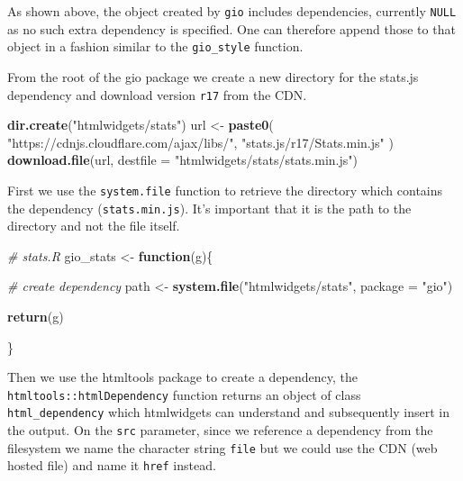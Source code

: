 \documentclass[
]{krantz}
\makeatletter
\newenvironment{Shaded}{\begin{snugshade}}{\end{snugshade}}
\newcommand{\CommentTok}[1]{\textcolor[rgb]{0.37,0.37,0.37}{\textit{#1}}}
\newcommand{\ControlFlowTok}[1]{\textcolor[rgb]{0.27,0.27,0.27}{\textbf{#1}}}
\newcommand{\DataTypeTok}[1]{\textcolor[rgb]{0.27,0.27,0.27}{#1}}
\newcommand{\KeywordTok}[1]{\textcolor[rgb]{0.27,0.27,0.27}{\textbf{#1}}}
\newcommand{\NormalTok}[1]{#1}
\newcommand{\StringTok}[1]{\textcolor[rgb]{0.5,0.5,0.5}{#1}}
\newenvironment{kframe}{%
\medskip{}
\setlength{\fboxsep}{.8em}
 \def\at@end@of@kframe{}%
 \ifinner\ifhmode%
  \def\at@end@of@kframe{\end{minipage}}%
  \begin{minipage}{\columnwidth}%
 \fi\fi%
 \def\FrameCommand##1{\hskip\@totalleftmargin \hskip-\fboxsep
 \colorbox{shadecolor}{##1}\hskip-\fboxsep
     \hskip-\linewidth \hskip-\@totalleftmargin \hskip\columnwidth}%
 \MakeFramed {\advance\hsize-\width
   \@totalleftmargin\z@ \linewidth\hsize
   \@setminipage}}%
 {\par\unskip\endMakeFramed%
 \at@end@of@kframe}
\renewenvironment{Shaded}{\begin{kframe}}{\end{kframe}}
\makeatother
\begin{document}
As shown above, the object created by \texttt{gio} includes dependencies, currently \texttt{NULL} as no such extra dependency is specified. One can therefore append those to that object in a fashion similar to the \texttt{gio\_style} function.

From the root of the gio package we create a new directory for the stats.js dependency and download version \texttt{r17} from the CDN.

\begin{Shaded}
\begin{Highlighting}[]
\KeywordTok{dir.create}\NormalTok{(}\StringTok{"htmlwidgets/stats"}\NormalTok{)}
\NormalTok{url <{-}}\StringTok{ }\KeywordTok{paste0}\NormalTok{(}
  \StringTok{"https://cdnjs.cloudflare.com/ajax/libs/"}\NormalTok{,}
  \StringTok{"stats.js/r17/Stats.min.js"}
\NormalTok{)}
\KeywordTok{download.file}\NormalTok{(url, }\DataTypeTok{destfile =} \StringTok{"htmlwidgets/stats/stats.min.js"}\NormalTok{)}
\end{Highlighting}
\end{Shaded}

First we use the \texttt{system.file} function to retrieve the directory which contains the dependency (\texttt{stats.min.js}). It's important that it is the path to the directory and not the file itself.

\begin{Shaded}
\begin{Highlighting}[]
\CommentTok{\# stats.R}
\NormalTok{gio\_stats <{-}}\StringTok{ }\ControlFlowTok{function}\NormalTok{(g)\{}

  \CommentTok{\# create dependency}
\NormalTok{  path <{-}}\StringTok{ }\KeywordTok{system.file}\NormalTok{(}\StringTok{"htmlwidgets/stats"}\NormalTok{, }\DataTypeTok{package =} \StringTok{"gio"}\NormalTok{)}

  \KeywordTok{return}\NormalTok{(g)}

\NormalTok{\}}
\end{Highlighting}
\end{Shaded}

Then we use the htmltools package to create a dependency, the \texttt{htmltools::htmlDependency} function returns an object of class \texttt{html\_dependency} which htmlwidgets can understand and subsequently insert in the output. On the \texttt{src} parameter, since we reference a dependency from the filesystem we name the character string \texttt{file} but we could use the CDN (web hosted file) and name it \texttt{href} instead.
\end{document}
